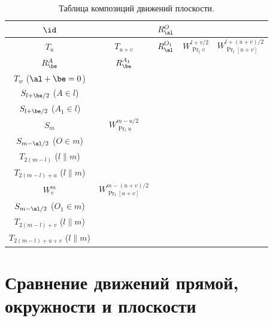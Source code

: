 \begin{table}%
\renewcommand{\arraystretch}{1.8}\renewcommand{\tabcolsep}{1mm}
\begin{center}\LARGE
\caption{Таблица композиций движений плоскости.}\label{PlaneTransitions}
\begin{tabular}{c|c|c|c|c}
\rowcolor{darkred}
\textcolor{white}{$\id$}  &  \textcolor{white}{$T_u$} & \textcolor{white}{$R_\al^O$}  & \textcolor{white}{$S_l$} & \textcolor{white}{$W_u^l$}  \\
\hline\hline
$T_u$  &  $T_{u+v}$  &   $R_\al^{O_1}$ & $W_{\Pr_lv}^{l+v/2}$ & $W_{\Pr_l[u+v]}^{l+(u+v)/2}$ \\ \hline 
$R_\be^A$ & $R_\be^{A_1}$ & \specialcell{$R_{\al+\be}^C$ ($\al+\be\ne 0$) \\ $T_w$ ($\al+\be=0$)} & \specialcell{$W_w^{l+\be/2}$ ($A\notin l$) \\ $S_{l+\be/2}$ ($A\in l$)} & \specialcell{$W_w^{l+\be/2}$ ($A_1\notin l$) \\ $S_{l+\be/2}$ ($A_1\in l$)} \\ \hline 
$S_m$ & $W_{\Pr_lu}^{m-u/2} $ & \specialcell{$W_w^{m-\al/2}$ ($O\notin m$) \\ $S_{m-\al/2}$ ($O\in m$)} &
\specialcell{$R_{2\angle lm}^{l\cap m}$ ($l\not\parallel m$) \\ $T_{2(m-l)}$ ($l\parallel m$)} & 
\specialcell{$R_{2\angle lm}^O$ ($l\not\parallel m$) \\ $T_{2(m-l)+u}$ ($l\parallel m$)} \\ \hline 
$W_v^m$ & $W_{\Pr_l[u+v]}^{m-(u+v)/2}$ & \specialcell{$W_w^{m-\al/2}$ ($O_1\notin m$) \\ $S_{m-\al/2}$ ($O_1\in m$)} &
\specialcell{$R_{2\angle lm}^O$ ($l\not\parallel m$) \\ $T_{2(m-l)+v}$ ($l\parallel m$)} &
\specialcell{$R_{2\angle lm}^O$ ($l\not\parallel m$) \\ $T_{2(m-l)+u+v}$ ($l\parallel m$)} \\ \hline\hline
\end{tabular}
\end{center}
\end{table}




\section{Сравнение движений прямой, окружности и плоскости}



